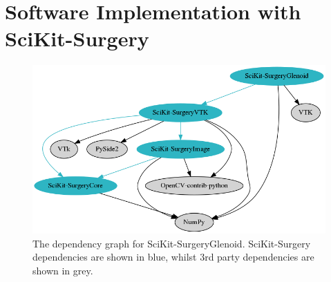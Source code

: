 \section{Software Implementation with SciKit-Surgery}

\begin{figure}
	\begin{center}
		\includegraphics[width=0.6\linewidth]{figures/graphviz-f4a0d46f29de525cf2512540ebd2f3e3f3356594.png}
                        \caption{The dependency graph for SciKit-SurgeryGlenoid. SciKit-Surgery dependencies are shown in blue, whilst 3rd party dependencies are shown in grey.}
	\end{center}
\end{figure}
